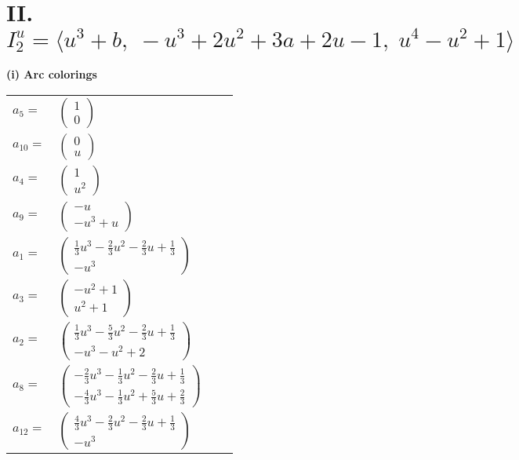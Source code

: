 \documentclass[1p]{elsarticle_modified}
\theoremstyle{definition}
\begin{document}
\centering \section*{II. $I^u_{2}= \langle u^3+b,\;- u^3+2 u^2+3 a+2 u-1,\;u^4- u^2+1 \rangle$}
\flushleft \textbf{(i) Arc colorings}\\
\begin{tabular}{m{7pt} m{180pt} m{7pt} m{180pt} }
\flushright $a_{5}=$&$\begin{pmatrix}1\\0\end{pmatrix}$ \\
\flushright $a_{10}=$&$\begin{pmatrix}0\\u\end{pmatrix}$ \\
\flushright $a_{4}=$&$\begin{pmatrix}1\\u^2\end{pmatrix}$ \\
\flushright $a_{9}=$&$\begin{pmatrix}- u\\- u^3+u\end{pmatrix}$ \\
\flushright $a_{1}=$&$\begin{pmatrix}\frac{1}{3} u^3-\frac{2}{3} u^2-\frac{2}{3} u+\frac{1}{3}\\- u^3\end{pmatrix}$ \\
\flushright $a_{3}=$&$\begin{pmatrix}- u^2+1\\u^2+1\end{pmatrix}$ \\
\flushright $a_{2}=$&$\begin{pmatrix}\frac{1}{3} u^3-\frac{5}{3} u^2-\frac{2}{3} u+\frac{1}{3}\\- u^3- u^2+2\end{pmatrix}$ \\
\flushright $a_{8}=$&$\begin{pmatrix}-\frac{2}{3} u^3-\frac{1}{3} u^2-\frac{2}{3} u+\frac{1}{3}\\-\frac{4}{3} u^3-\frac{1}{3} u^2+\frac{5}{3} u+\frac{2}{3}\end{pmatrix}$ \\
\flushright $a_{12}=$&$\begin{pmatrix}\frac{4}{3} u^3-\frac{2}{3} u^2-\frac{2}{3} u+\frac{1}{3}\\- u^3\end{pmatrix}$ \\

\end{tabular}
\end{document}
